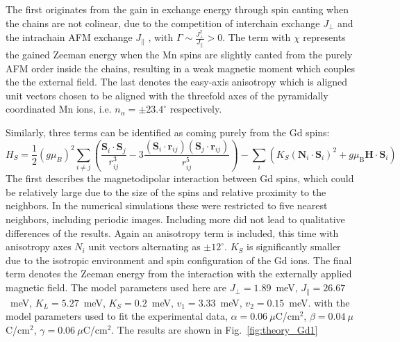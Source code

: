 The first originates from the gain in exchange energy through spin canting when the chains are not colinear, due to the competition of interchain exchange $J_\perp$ and the intrachain AFM exchange $J_\|$ \cite{Sushkov2008}, with $\Gamma\sim\frac{J_{\perp}^2}{J_\|}>0$. The term with $\chi$ represents the gained Zeeman energy when the Mn spins are slightly canted from the purely AFM order inside the chains, resulting in a weak magnetic moment which couples the the external field. The last denotes the easy-axis anisotropy which is aligned unit vectors chosen to be aligned with the threefold axes of the pyramidally coordinated Mn ions, i.e. $n_\alpha=\pm23.4^\circ$ respectively.

Similarly, three terms can be identified as coming purely from the Gd spins:
\begin{equation}
     H_S=\frac{1}{2}(g \mu_B)^2\sum_{i\neq j}\left(\frac{\mathbf{S}_i\cdot \mathbf{S}_j}{r_{ij}^3}-3\frac{(\mathbf{S}_i\cdot \mathbf{r}_{ij})(\mathbf{S}_j\cdot \mathbf{r}_{ij})}{r_{ij}^5}\right) - \sum_i\left( K_S(\mathbf{N}_i\cdot \mathbf{S}_i)^2 + g\mu_\mathrm{B} \mathbf{H} \cdot \mathbf{S}_i\right) 
\end{equation}
The first describes the magnetodipolar interaction between Gd spins, which could be relatively large due to the size of the spins and relative proximity to the neighbors. In the numerical simulations these were restricted to five nearest neighbors, including periodic images. Including more did not lead to qualitative differences of the results. Again an anisotropy term is included, this time with anisotropy axes $N_i$ unit vectors alternating as $\pm 12^\circ$. $K_S$ is significantly smaller due to the isotropic environment and spin configuration of the Gd ions.
The final term denotes the Zeeman energy from the interaction with the externally applied magnetic field.
The model parameters used here are $J_\perp = 1.89$~meV, $J_\parallel = 26.67$~meV, $K_L = 5.27$~meV, $K_S = 0.2$~meV, $v_1 = 3.33$~meV, $v_2 = 0.15$~meV. 
with the model parameters used to fit the experimental data, $\alpha = 0.06\:\mu$C/cm$^2$, $\beta = 0.04\:\mu$C/cm$^2$, $\gamma = 0.06\:\mu$C/cm$^2$. The results are shown in Fig.~\ref{fig:theory_Gd1}

